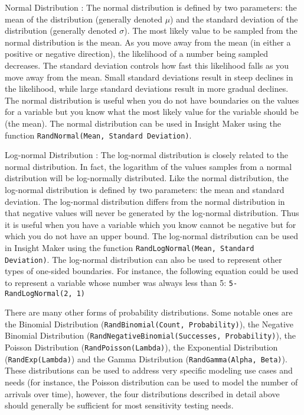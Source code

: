 \documentclass[]{memoir}
\begin{document}
Normal Distribution : The normal distribution is defined by two
parameters: the mean of the distribution (generally denoted $\mu$) and
the standard deviation of the distribution (generally denoted $\sigma$).
The most likely value to be sampled from the normal distribution is the
mean. As you move away from the mean (in either a positive or negative
direction), the likelihood of a number being sampled decreases. The
standard deviation controls how fast this likelihood falls as you move
away from the mean. Small standard deviations result in steep declines
in the likelihood, while large standard deviations result in more
gradual declines. The normal distribution is useful when you do not have
boundaries on the values for a variable but you know what the most
likely value for the variable should be (the mean). The normal
distribution can be used in Insight Maker using the function
\lstinline!RandNormal(Mean, Standard Deviation)!.

Log-normal Distribution : The log-normal distribution is closely related
to the normal distribution. In fact, the logarithm of the values samples
from a normal distribution will be log-normally distributed. Like the
normal distribution, the log-normal distribution is defined by two
parameters: the mean and standard deviation. The log-normal distribution
differs from the normal distribution in that negative values will never
be generated by the log-normal distribution. Thus it is useful when you
have a variable which you know cannot be negative but for which you do
not have an upper bound. The log-normal distribution can be used in
Insight Maker using the function
\lstinline!RandLogNormal(Mean, Standard Deviation)!. The log-normal
distribution can also be used to represent other types of one-sided
boundaries. For instance, the following equation could be used to
represent a variable whose number was always less than 5:
\lstinline!5-RandLogNormal(2, 1)!

There are many other forms of probability distributions. Some notable
ones are the Binomial Distribution
(\lstinline!RandBinomial(Count, Probability)!), the Negative Binomial
Distribution (\lstinline!RandNegativeBinomial(Successes, Probability)!),
the Poisson Distribution (\lstinline!RandPoisson(Lambda)!), the
Exponential Distribution (\lstinline!RandExp(Lambda)!) and the Gamma
Distribution (\lstinline!RandGamma(Alpha, Beta)!). These distributions
can be used to address very specific modeling use cases and needs (for
instance, the Poisson distribution can be used to model the number of
arrivals over time), however, the four distributions described in detail
above should generally be sufficient for most sensitivity testing needs.
\end{document}
